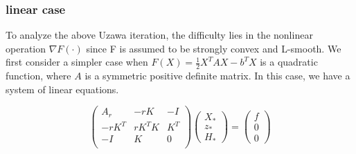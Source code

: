 \begin{itemize}
\begin{comment} 
\begin{lemma}
For the error propagation matrix, we have $\rho(I - N^{-1}S) =\eta < 1$. 
\end{lemma}
\begin{proof}
\textcolor{red}{We found this part is not accurate and need to modify.
First, we observe that $I - N^{-1}S$ is given as follows:


where $E := K^T K = n I$, $Q_A = I - r A_r^{-1}$. We note that 

By $2\times 2$ block matrix decomposition, we have the error propagation matrix is spectrally equivalent to the following matrix
\begin{equation}\label{mat1}
    \begin{pmatrix}
   S1 & 0 \\
 0   &
 S_2 + S_3   \end{pmatrix},
\end{equation}
where $S_1 = I -   E^{-1} K^T Q_A K$, $S_2 = (I - M_2)Q_A $, $S_3 = (I- M_2) Q_A K (I - E^{-1} K^T Q_A K )^{-1} E^{-1} K^T Q_A $.

It is easy to see that $S_1$ is symmetric positive and has $\rho(S_1) < 1$.
We also have $\rho(S_2) \leq \frac{C_0}{r + C_0}$, $\rho(S_3) \leq \frac{C_0}{ r+C_0}\frac{r +C_0}{r} \frac{C_0}{r +C_0 }$. So $\rho(S_2 + S_3) \leq \frac{C_0}{r} \le 1 $ for sufficiently large $r$. 

We can then take $\eta = \min \{ \rho(S_1), \frac{C_0}{r} \}$. This completes the proof.}
\end{proof}
\end{comment} 

\subsubsection{linear case}
To analyze the above Uzawa iteration, the difficulty lies in the nonlinear operation $\nabla F(\cdot)$ since F is assumed to be strongly convex and L-smooth. We first consider a simpler case when $F(X) = \frac{1}{2} X^T A X - b^T X$ is a quadratic function, where $A$ is a symmetric positive definite matrix. In this case, we have a system of linear equations. 

\begin{equation}
\label{optimality condition in linear case}
    \begin{pmatrix}
    A_r & -r K & -I \\
    -r K^T& r K^TK & K^T\\
    -I& K & 0\\
    \end{pmatrix}
    \begin{pmatrix}
    X_*\\
    z_* \\
    H_*
    \end{pmatrix} = 
    \begin{pmatrix}
    f\\
    0\\
    0
    \end{pmatrix}
\end{equation}


\end{itemize}
